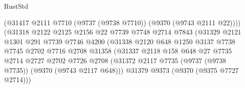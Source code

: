 \begin{lexlean}{RustStd}
\begin{coremodule}
{\begin{coremodule}
{{{{{{{{{{{{{{{{{{{{{{{{{{{{{{{{{{{{{{{                                        (@31417
                                          @2111
                                          @7710
                                          (@9737 (@9738 @7710))
                                          (@9370 (@9743 @2111 @22))))
                                      (@31318
                                        @2122
                                        @2125
                                        @2156
                                        @22
                                        @7739
                                        @7748
                                        @2714
                                        @7843
                                        (@31329
                                          @2121
                                          @1301
                                          @291
                                          @7739
                                          @7746
                                          @4200
                                          (@31338
                                            @2120
                                            @648
                                            @1250
                                            @3137
                                            @7738
                                            @7745
                                            @2702
                                            @7716
                                            @2708
                                            @31358
                                            (@31337
                                              @2118
                                              @158
                                              @648
                                              @27
                                              @7735
                                              @2714
                                              @2727
                                              @2702
                                              @7726
                                              @2708
                                              (@31372
                                                @2117
                                                @7735
                                                (@9737 (@9738 @7735))
                                                (@9370 (@9743 @2117 @648)))
                                              @31379
                                              @9373
                                              (@9370 (@9375 @7727 @2714)))
}}}}}}}}}}}}}}}}}}}}}}}}}}}}}}}}}}}}}}}
\end{coremodule}}
\end{coremodule}
\end{lexlean}
